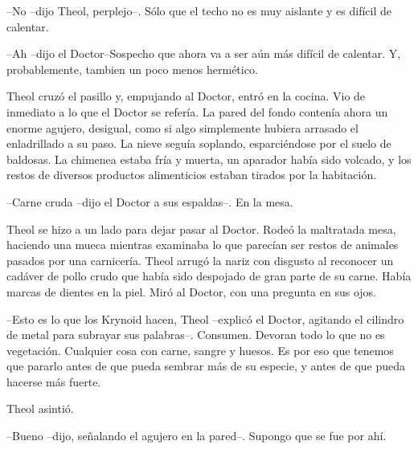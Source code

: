 --No --dijo Theol, perplejo--. Sólo que el techo no es muy aislante y es difícil de calentar.



--Ah --dijo el Doctor--Sospecho que ahora va a ser aún más difícil de calentar. Y, probablemente, tambien un poco menos hermético.



Theol cruzó el pasillo y, empujando al Doctor, entró en la cocina. Vio de inmediato a lo que el Doctor se refería. La pared del fondo contenía ahora un enorme agujero, desigual, como si algo simplemente hubiera arrasado el enladrillado a su paso. La nieve seguía soplando, esparciéndose por el suelo de baldosas. La chimenea estaba fría y muerta, un aparador había sido volcado, y los restos de diversos productos alimenticios estaban tirados por la habitación.



--Carne cruda --dijo el Doctor a sus espaldas--. En la mesa.



Theol se hizo a un lado para dejar pasar al Doctor. Rodeó la maltratada mesa, haciendo una mueca mientras examinaba lo que parecían ser restos de animales pasados por una carnicería. Theol arrugó la nariz con disgusto al reconocer un cadáver de pollo crudo que había sido despojado de gran parte de su carne. Había marcas de dientes en la piel. Miró al Doctor, con una pregunta en sus ojos.



--Esto es lo que los Krynoid hacen, Theol --explicó el Doctor, agitando el cilindro de metal para subrayar sus palabras--. Consumen. Devoran todo lo que no es vegetación. Cualquier cosa con carne, sangre y huesos. Es por eso que tenemos que pararlo antes de que pueda sembrar más de su especie, y antes de que pueda hacerse más fuerte.



Theol asintió.

--Bueno --dijo, señalando el agujero en la pared--. Supongo que se fue por ahí.
